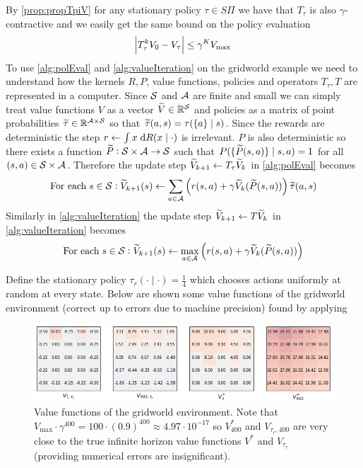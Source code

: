 \begin{example}[Gridworld]
  By \cref{prop:propTpiV} for any stationary policy $\tau \in S\Pi$ we have
  that $T_\tau$ is also $\gamma$-contractive and we
  easily get the same bound on the policy evaluation
  \[ \abs{T_\tau^k V_0 - V_\tau} \leq \gamma^K V_{\max} \]
  To use \cref{alg:polEval} and \cref{alg:valueIteration} on the gridworld
  example we need to understand how the kernels $R, P$, value functions,
  policies and operators $T_\tau, T$ are represented in a computer.
  Since $\mathcal{S}$ and $\mathcal{A}$ are finite and small we can simply
  treat value functions $V$ as a vector $\widetilde{V} \in \mathbb{R}^{\mathcal{S}}$ and
  policies as a matrix of point probabilities
  $\widetilde{\tau} \in \mathbb{R}^{\mathcal{A} \times \mathcal{S}}$ so that
  $\widetilde{\tau}(a, s) = \tau(\{a\} \mid s)$.
  Since the rewards are deterministic
  the step $r \leftarrow \int x \; \mathrm{d} R(x \mid \cdot)$ is irrelevant.
  $P$ is also deterministic so there exists a function
  $\widetilde{P} : \mathcal{S} \times \mathcal{A} \to \mathcal{S}$ such that
  $P(\{\widetilde{P}(s, a)\} \mid s, a) = 1$ for all $(s, a) \in \mathcal{S} \times \mathcal{A}$.
  Therefore the update step
  $\widetilde{V}_{k+1} \leftarrow T_\tau \widetilde{V}_k$ in \cref{alg:polEval}
  becomes
  \[ \text{For each} \; s \in \mathcal{S} :
    \widetilde{V}_{k+1}(s) \leftarrow
    \sum_{a \in \mathcal{A}}
  \left(r(s, a) + \gamma \widetilde{V}_k(\widetilde{P}(s,a)) \right) \widetilde{\tau}(a, s) \]
  Similarly in \cref{alg:valueIteration} the update step
  $\widetilde{V}_{k+1} \leftarrow T \widetilde{V}_k$ in \cref{alg:valueIteration}
  becomes
  \[ \text{For each} \; s \in \mathcal{S} :
    \widetilde{V}_{k+1}(s) \leftarrow
    \max_{a \in \mathcal{A}} \left(
  r(s, a) + \gamma \widetilde{V}_k(\widetilde{P}(s,a)) \right) \]

  Define the stationary policy $\tau_r(\cdot \mid \cdot) = \frac{1}{4}$ which
  chooses actions uniformly at random at every state.
  Below are shown some value functions of the gridworld environment
  (correct up to errors due to machine precision)
  found by applying 

  \begin{figure}[H]
    \centering
    \includegraphics[scale=0.8]{figs/gridworld1.png}
    \caption{Value functions of the gridworld environment.
      Note that $V_{\max} \cdot \gamma^{400} = 100 \cdot (0.9)^{400}
      \approx 4.97 \cdot 10^{-17}$ so $V^*_{400}$ and $V_{\tau_r, 400}$
      are very close to the true infinite horizon value functions
    $V^*$ and $V_{\tau_r}$ (providing numerical errors are insignificant).}
    \label{fig:gw1}
  \end{figure}


\end{example}
